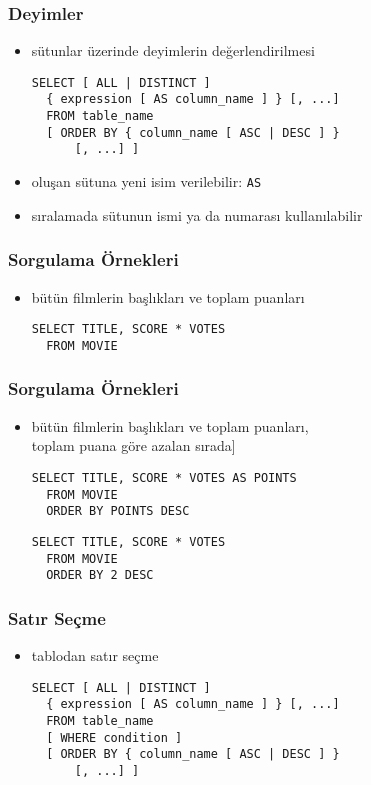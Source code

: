 \documentclass[dvipsnames]{beamer}
\theoremstyle{plain}
\begin{document}
\begin{frame}[fragile]
  \frametitle{Deyimler}

   \begin{itemize}
     \item sütunlar üzerinde deyimlerin değerlendirilmesi
    \begin{lstlisting}
SELECT [ ALL | DISTINCT ]
  { expression [ AS column_name ] } [, ...]
  FROM table_name
  [ ORDER BY { column_name [ ASC | DESC ] }
      [, ...] ]
    \end{lstlisting}

  \medskip
    \item oluşan sütuna yeni isim verilebilir: \lstinline!AS!
    \item sıralamada sütunun ismi ya da numarası kullanılabilir
  \end{itemize}
\end{frame}

\begin{frame}[fragile]
  \frametitle{Sorgulama Örnekleri}

  \begin{itemize}
    \item bütün filmlerin başlıkları ve toplam puanları
    \begin{lstlisting}
SELECT TITLE, SCORE * VOTES
  FROM MOVIE
    \end{lstlisting}
  \end{itemize}
\end{frame}

\begin{frame}[fragile]
  \frametitle{Sorgulama Örnekleri}

  \begin{itemize}
    \item bütün filmlerin başlıkları ve toplam puanları,\\
                toplam puana göre azalan sırada]
    \begin{lstlisting}
SELECT TITLE, SCORE * VOTES AS POINTS
  FROM MOVIE
  ORDER BY POINTS DESC
    \end{lstlisting}

    \pause
    \begin{lstlisting}
SELECT TITLE, SCORE * VOTES
  FROM MOVIE
  ORDER BY 2 DESC
    \end{lstlisting}
  \end{itemize}
\end{frame}

\begin{frame}[fragile]
  \frametitle{Satır Seçme}

  \begin{itemize}
    \item tablodan satır seçme
    \begin{lstlisting}
SELECT [ ALL | DISTINCT ]
  { expression [ AS column_name ] } [, ...]
  FROM table_name
  [ WHERE condition ]
  [ ORDER BY { column_name [ ASC | DESC ] }
      [, ...] ]
    \end{lstlisting}
  \end{itemize}
\end{frame}
\end{document}
